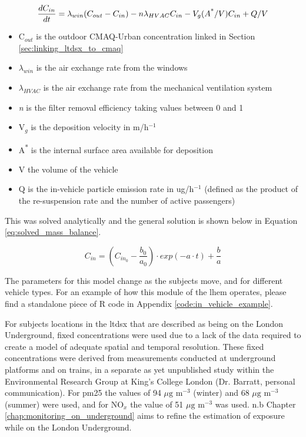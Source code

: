 \begin{equation}
\frac{dC_{in}}{dt} = \lambda _{win} (C_{out} - C_{in}) - n\lambda _{HVAC} C_{in} - V_{g} (A\textsuperscript{*}/V) C_{in} + Q/V
\label{eq:mass_balance}
\end{equation}

\begin{itemize}
\item C$_{out}$ is the outdoor CMAQ-Urban concentration linked in Section \ref{sec:linking_ltdsx_to_cmaq}
\item $\lambda _{win}$ is the air exchange rate from the windows
\item $\lambda _{HV AC}$ is the air exchange rate from the  mechanical ventilation system
\item \textit{n} is the filter removal efficiency taking values between 0 and 1
\item V$_{g}$ is the deposition velocity in m/h$^{-1}$
\item A\textsuperscript{*} is the internal surface area available for deposition
\item V the volume of the vehicle
\item Q is the in-vehicle particle emission rate in ug/h$^{-1}$ (defined as the product of the re-suspension rate and the number of active passengers)
\end{itemize}

This was solved analytically and the general solution is shown below in Equation \ref{eq:solved_mass_balance}.

\begin{equation}
C_{in} = (C_{in_{0}} - \frac{b_{0}}{a_{0}}) \cdot exp(-a \cdot t) + \frac{b}{a}
\label{eq:solved_mass_balance}
\end{equation}

The parameters for this model change as the subjects move, and for different vehicle types. For an example of how this module of the \gls{lhem} operates, please find a standalone piece of R code in Appendix \autoref{code:in_vehicle_example}.
            
For subjects locations in the \gls{ltdsx} that are described as being on the London Underground, fixed concentrations were used due to a lack of the data required to create a model of adequate spatial and temporal resolution. These fixed concentrations were derived from measurements conducted at underground platforms and on trains, in a separate as yet unpublished study within the Environmental Research Group at King's College London (Dr. Barratt, personal communication). For \gls{pm25} the values of 94 $\mu \text{g m}^{-3}$ (winter) and 68 $\mu \text{g m}^{-3}$ (summer) were used, and for NO$_{x}$ the value of 51 $\mu \text{g m}^{-3}$ was used. n.b Chapter \ref{chap:monitoring_on_underground} aims to refine the estimation of exposure while on the London Underground.

